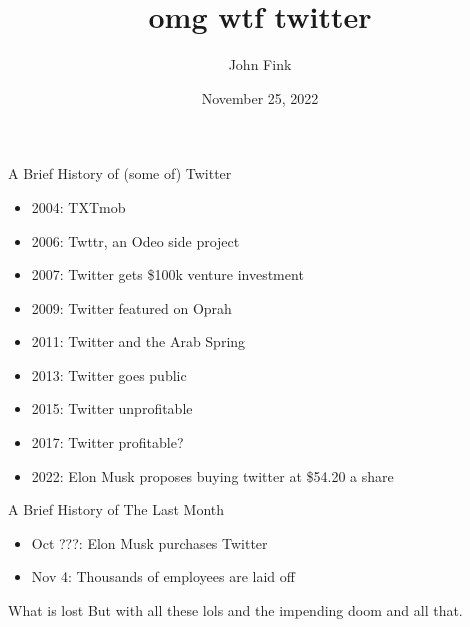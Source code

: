 \documentclass{beamer}
\title{omg wtf twitter}
\author{John Fink}
\date{November 25, 2022}
\begin{document}
\begin{frame}[plain]
    \maketitle
\end{frame}
\begin{frame}{A Brief History of (some of) Twitter}
	\begin{itemize}
		\pause
		\item 2004: TXTmob
		\pause
		\item 2006: Twttr, an Odeo side project
		\pause
		\item 2007: Twitter gets \$100k venture investment
		\pause
		\item 2009: Twitter featured on Oprah
		\pause
		\item 2011: Twitter and the Arab Spring
		\pause
		\item 2013: Twitter goes public
		\pause 
		\item 2015: Twitter unprofitable
		\pause
		\item 2017: Twitter profitable?
		\pause
		\item 2022: Elon Musk proposes buying twitter at \$54.20 a share
	\end{itemize}
\end{frame}

\begin{frame}{A Brief History of The Last Month}
	\begin{itemize}
		\pause
		\item Oct ???: Elon Musk purchases Twitter
		\pause
		\item Nov 4: Thousands of employees are laid off
	\end{itemize}
\end{frame}

\begin{frame}{What is lost}
	But with all these lols and the impending doom and all that.
\end{frame}
\end{document}
